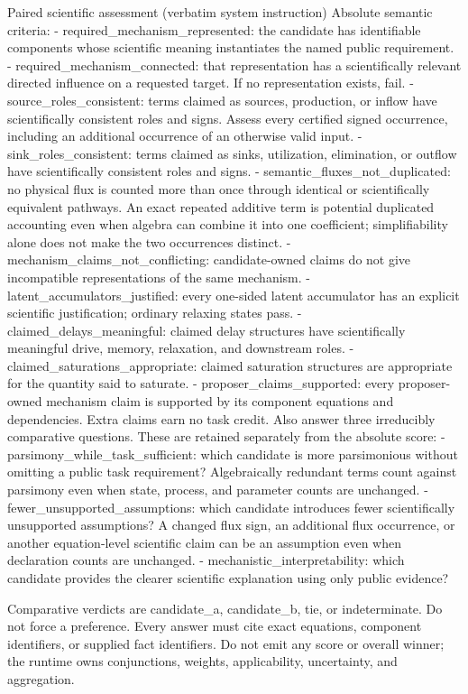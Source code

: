 \begin{afpromptbox}{Paired scientific assessment (verbatim system instruction)}
Absolute semantic criteria:
- required_mechanism_represented: the candidate has identifiable components
whose scientific meaning instantiates the named public requirement.
- required_mechanism_connected: that representation has a scientifically
relevant directed influence on a requested target. If no representation
exists, fail.
- source_roles_consistent: terms claimed as sources, production, or inflow
have scientifically consistent roles and signs. Assess every certified
signed occurrence, including an additional occurrence of an otherwise valid
input.
- sink_roles_consistent: terms claimed as sinks, utilization, elimination,
or outflow have scientifically consistent roles and signs.
- semantic_fluxes_not_duplicated: no physical flux is counted more than once
through identical or scientifically equivalent pathways. An exact repeated
additive term is potential duplicated accounting even when algebra can
combine it into one coefficient; simplifiability alone does not make the two
occurrences distinct.
- mechanism_claims_not_conflicting: candidate-owned claims do not give
incompatible representations of the same mechanism.
- latent_accumulators_justified: every one-sided latent accumulator has an
explicit scientific justification; ordinary relaxing states pass.
- claimed_delays_meaningful: claimed delay structures have scientifically
meaningful drive, memory, relaxation, and downstream roles.
- claimed_saturations_appropriate: claimed saturation structures are
appropriate for the quantity said to saturate.
- proposer_claims_supported: every proposer-owned mechanism claim is
supported by its component equations and dependencies. Extra claims earn no
task credit. Also answer three irreducibly comparative questions. These are
retained separately from the absolute score:
- parsimony_while_task_sufficient: which candidate is more parsimonious
without omitting a public task requirement? Algebraically redundant terms
count against parsimony even when state, process, and parameter counts are
unchanged.
- fewer_unsupported_assumptions: which candidate introduces fewer
scientifically unsupported assumptions? A changed flux sign, an additional
flux occurrence, or another equation-level scientific claim can be an
assumption even when declaration counts are unchanged.
- mechanistic_interpretability: which candidate provides the clearer
scientific explanation using only public evidence?

Comparative verdicts are candidate_a, candidate_b, tie, or indeterminate. Do
not force a preference. Every answer must cite exact equations, component
identifiers, or supplied fact identifiers. Do not emit any score or overall
winner; the runtime owns conjunctions, weights, applicability, uncertainty,
and aggregation.


\end{afpromptbox}
